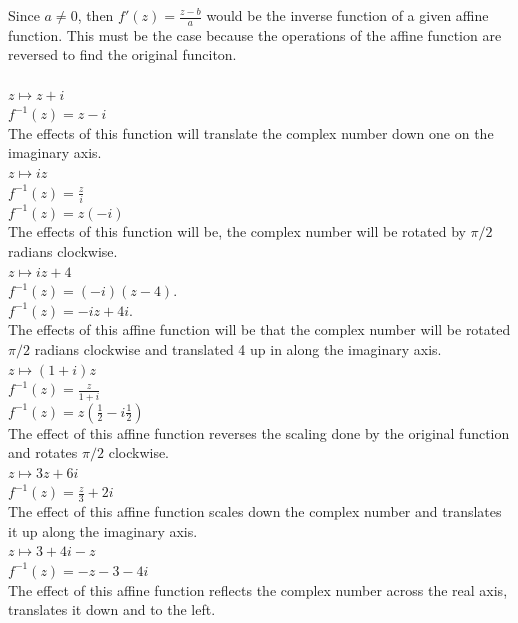\documentclass[12pt]{article}
\begin{document}
Since $a \neq 0$, then $f'(z) = \frac{z-b}{a}$ would be the inverse function of a given affine function. 
This must be the case because the operations of the affine function are reversed to find the original funciton.\\

\\

 $z \mapsto z + i$\\
$f^{-1}(z) = z - i$\\
The effects of this function will translate the complex number down one on the imaginary axis.\\


 $z \mapsto iz$\\
$f^{-1}(z) = \frac{z}{i}$\\
$f^{-1}(z) = z(-i)$\\
The effects of this function will be, the complex number will be rotated by $\pi/2$ radians clockwise.\\


 $z \mapsto iz + 4$\\
$f^{-1}(z) = (-i)(z - 4)$.\\
$f^{-1}(z) = -iz + 4i$.\\
The effects of this affine function will be that the complex number will be rotated $\pi/2$ radians clockwise and translated 4 up in along the imaginary axis.\\


 $z \mapsto (1 + i)z$\\
$f^{-1}(z) = \frac{z}{1+i}$\\
$f^{-1}(z) = z(\frac{1}{2} - i\frac{1}{2})$\\
The effect of this affine function reverses the scaling done by the original function and rotates $\pi/2$ clockwise.\\

 $z \mapsto 3z + 6i$\\
$f^{-1}(z) = \frac{z}{3} + 2i$\\
The effect of this affine function scales down the complex number and translates it up along the imaginary axis.\\

 $z \mapsto 3 + 4i - z$\\
$f^{-1}(z) = -z - 3 - 4i$\\
The effect of this affine function reflects the complex number across the real axis, translates it down and to the left.\\
\end{document}
